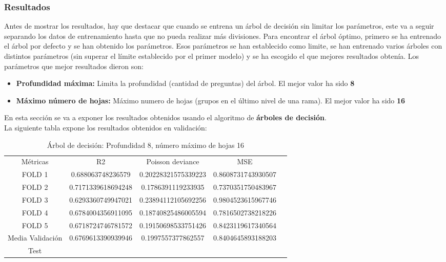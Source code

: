 \subsubsection{Resultados}
Antes de mostrar los resultados, hay que destacar que cuando se entrena un árbol de decisión sin limitar los parámetros, este va a seguir separando los datos de entrenamiento hasta que no pueda realizar más divisiones. Para encontrar el árbol óptimo, primero se ha entrenado el árbol por defecto y se han obtenido los parámetros. Esos parámetros se han establecido como limite, se han entrenado varios árboles con distintos parámetros (sin superar el límite establecido por el primer modelo) y se ha escogido el que mejores resultados obtenía. Los parámetros que mejor resultados dieron son: \\
\begin{itemize}
	\item \textbf{Profundidad máxima:} Limita la profundidad (cantidad de preguntas) del árbol. El mejor valor ha sido \textbf{8}
	\item \textbf{Máximo número de hojas:} Máximo numero de hojas (grupos en el último nivel de una rama). El mejor valor ha sido \textbf{16}
\end{itemize} 
\linebreak
En esta sección se va a exponer los resultados obtenidos usando el algoritmo de \textbf{árboles de decisión}.\\
La siguiente tabla expone los resultados obtenidos en validación:
\begin{table}[htbp]
    \begin{tabular}{|c|c|c|c|c}
    \cline{1-4}
    Métricas & R2                 & Poisson deviance    & MSE                  \\ \cline{1-4}
    FOLD 1   & 0.688063748236579  & 0.20228321575339223 & 0.8608731743930507   \\ \cline{1-4}
    FOLD 2   & 0.7171339618694248 & 0.1786391119233935  & 0.7370351750483967   \\ \cline{1-4}
    FOLD 3   & 0.6293360749947021 & 0.23894112105692256 & 0.9804523615967746   \\ \cline{1-4}
    FOLD 4   & 0.6784004356911095 & 0.18740825486005594 & 0.7816502738218226   \\ \cline{1-4}
    FOLD 5   & 0.6718724746781572 & 0.19150698533751426 & 0.8423119617340564   \\ \cline{1-4}
    Media Validación    & 0.6769613390939946 & 0.1997557377862557  & 0.8404645893188203   \\  \cline{1-4}
    Test & & & \\ \cline{1-4}
    \end{tabular}
	\caption{Árbol de decisión:  Profundidad 8, número máximo de hojas 16}
	\label{tab:tree_res}
\end{table}

